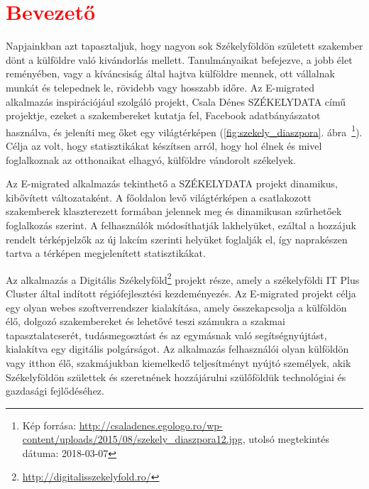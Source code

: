 \chapter*{\textcolor{red}{Bevezető}}

Napjainkban azt tapasztaljuk, hogy nagyon sok Székelyföldön született szakember dönt a külföldre való kivándorlás mellett. Tanulmányaikat befejezve, a jobb élet reményében, vagy a kíváncsiság által hajtva külföldre mennek, ott vállalnak munkát és telepednek le, rövidebb vagy hosszabb időre. Az E-migrated alkalmazás inspirációjául szolgáló projekt, Csala Dénes SZÉKELYDATA című projektje, ezeket a szakembereket kutatja fel, Facebook adatbányászatot használva, és jeleníti meg őket egy világtérképen (\ref{fig:szekely_diaszpora}. ábra~\footnote{Kép forrása: \url{http://csaladenes.egologo.ro/wp-content/uploads/2015/08/szekely_diaszpora12.jpg}, utolsó megtekintés dátuma: 2018-03-07}). Célja az volt, hogy statisztikákat készítsen arról, hogy hol élnek és mivel foglalkoznak az otthonaikat elhagyó, külföldre vándorolt székelyek. 

Az E-migrated alkalmazás tekinthető a SZÉKELYDATA projekt dinamikus, kibővített változataként. A főoldalon levő világtérképen a csatlakozott szakemberek klaszterezett formában jelennek meg és dinamikusan szűrhetőek foglalkozás szerint. A felhasználók módosíthatják lakhelyüket, ezáltal a hozzájuk rendelt térképjelzők az új lakcím szerinti helyüket foglalják el, így naprakészen tartva a térképen  megjelenített statisztikákat. 

Az alkalmazás a Digitális Székelyföld\footnote{\url{http://digitalisszekelyfold.ro/}} projekt része, amely  a székelyföldi IT Plus Cluster által indított régiófejlesztési kezdeményezés. Az E-migrated projekt célja egy olyan webes szoftverrendszer kialakítása, amely összekapcsolja a külföldön élő, dolgozó szakembereket és lehetővé teszi számukra a szakmai tapasztalatcserét, tudásmegosztást és az egymásnak való segítségnyújtást, kialakítva egy digitális polgárságot. Az alkalmazás felhasználói olyan külföldön vagy itthon élő, szakmájukban kiemelkedő teljesítményt nyújtó személyek, akik Székelyföldön születtek és szeretnének hozzájárulni szülőföldük technológiai és gazdasági fejlődéséhez. 

